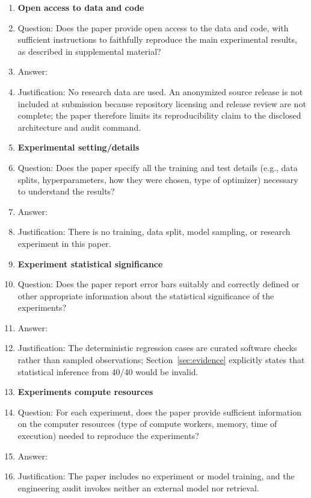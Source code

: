 \begin{enumerate}
\item {\bf Open access to data and code}
    \item[] Question: Does the paper provide open access to the data and code, with sufficient instructions to faithfully reproduce the main experimental results, as described in supplemental material?
    \item[] Answer: \answerNo{}
    \item[] Justification: No research data are used.  An anonymized source
    release is not included at submission because repository licensing and
    release review are not complete; the paper therefore limits its
    reproducibility claim to the disclosed architecture and audit command.

\item {\bf Experimental setting/details}
    \item[] Question: Does the paper specify all the training and test details (e.g., data splits, hyperparameters, how they were chosen, type of optimizer) necessary to understand the results?
    \item[] Answer: \answerNA{}
    \item[] Justification: There is no training, data split, model sampling,
    or research experiment in this paper.

\item {\bf Experiment statistical significance}
    \item[] Question: Does the paper report error bars suitably and correctly defined or other appropriate information about the statistical significance of the experiments?
    \item[] Answer: \answerNA{}
    \item[] Justification: The deterministic regression cases are curated
    software checks rather than sampled observations; Section~\ref{sec:evidence}
    explicitly states that statistical inference from 40/40 would be invalid.

\item {\bf Experiments compute resources}
    \item[] Question: For each experiment, does the paper provide sufficient information on the computer resources (type of compute workers, memory, time of execution) needed to reproduce the experiments?
    \item[] Answer: \answerNA{}
    \item[] Justification: The paper includes no experiment or model training,
    and the engineering audit invokes neither an external model nor retrieval.


\end{enumerate}
